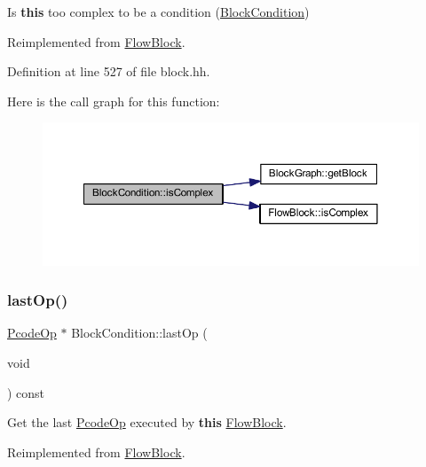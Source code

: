 Is {\bfseries{this}} too complex to be a condition (\mbox{\hyperlink{class_block_condition}{Block\+Condition}}) 



Reimplemented from \mbox{\hyperlink{class_flow_block_ad77905104bb4077b2d213c27b0582bf7}{Flow\+Block}}.



Definition at line 527 of file block.\+hh.

Here is the call graph for this function\+:
\nopagebreak
\begin{figure}[H]
\begin{center}
\leavevmode
\includegraphics[width=350pt]{class_block_condition_a38493adfe801b32d82244de3ee75c6fc_cgraph}
\end{center}
\end{figure}
\mbox{\label{class_block_condition_acfde1060a17a2c40b1cb9edf90e69595}} 
\subsubsection{\texorpdfstring{lastOp()}{lastOp()}}
{\footnotesize\ttfamily \mbox{\hyperlink{class_pcode_op}{Pcode\+Op}} $\ast$ Block\+Condition\+::last\+Op (\begin{DoxyParamCaption}\item[{void}]{ }\end{DoxyParamCaption}) const\hspace{0.3cm}{\ttfamily [virtual]}}



Get the last \mbox{\hyperlink{class_pcode_op}{Pcode\+Op}} executed by {\bfseries{this}} \mbox{\hyperlink{class_flow_block}{Flow\+Block}}. 



Reimplemented from \mbox{\hyperlink{class_flow_block_a5db2a7d4baa2070ebf3151b13fd16d09}{Flow\+Block}}.




